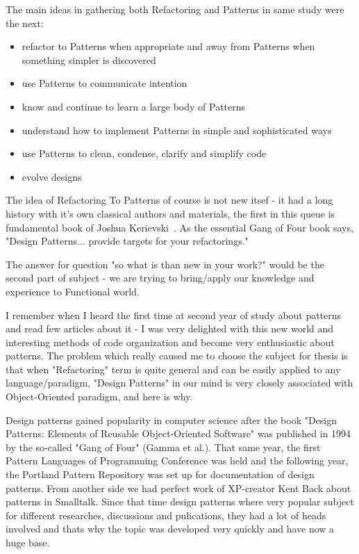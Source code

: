 The main ideas in gathering both Refactoring and Patterns in same study were the next:
\begin{itemize}
	\item refactor to Patterns when appropriate and away from Patterns when something simpler is discovered
	\item use Patterns to communicate intention
	\item know and continue to learn a large body of Patterns
	\item understand how to implement Patterns in simple and sophisticated ways
	\item use Patterns to clean, condense, clarify and simplify code
	\item evolve designs
\end{itemize}

The idea of Refactoring To Patterns of course is not new itsef - it had a long history with it's own classical authors and materials, the first in this queue is fundamental book of Joshua Kerievski~\cite{res11}. As the essential Gang of Four book says, "Design Patterns... provide targets for your refactorings."~\cite{res14} 

The answer for question "so what is than new in your work?" would be the second part of subject - we are trying to bring/apply our knowledge and experience to Functional world.

I remember when I heard the first time at second year of study about patterns and read few articles about it - I was very delighted with this new world and interesting methods of code organization and become very enthusiastic about patterns.
The problem which really caused me to choose the subject for thesis is that when "Refactoring" term is quite general and can be easily applied to any language/paradigm, "Design Patterns" in our mind is very closely associated with Object-Oriented paradigm, and here is why.

Design patterns gained popularity in computer science after the book "Design Patterns: Elements of Reusable Object-Oriented Software" was published in 1994 by the so-called "Gang of Four" (Gamma et al.). That same year, the first Pattern Languages of Programming Conference was held and the following year, the Portland Pattern Repository was set up for documentation of design patterns. From another side we had perfect work of XP-creator Kent Back about patterns in Smalltalk.
Since that time design patterns where very popular subject for different researches, discussions and pulications, they had a lot of heads involved and thats why the topic was developed very quickly and have now a huge base.

